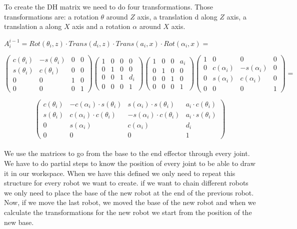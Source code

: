 \documentclass[12pt,a4paper,oneside,english]{book}
\begin{document}
To create the DH matrix we need to do four transformations. Those transformations are: a rotation $\theta$ around $Z$ axis, a translation d along $Z$ axis, a translation a along $X$ axis and a rotation $\alpha$ around $X$ axis.

$A_{i}^{i-1} = Rot(\theta_{i},z)\cdot Trans(d_{i},z)\cdot Trans(a_{i},x)\cdot Rot(\alpha_{i},x) =$

\[
\begin{pmatrix}
c(\theta_{i}) & -s(\theta_{i}) & 0 & 0\\
s(\theta_{i}) & c(\theta_{i}) & 0 & 0\\
0 & 0 & 1 & 0\\
0 & 0 & 0 & 1
\end{pmatrix}
\begin{pmatrix}
1 & 0 & 0 & 0\\
0 & 1 & 0 & 0\\
0 & 0 & 1 & d_{i}\\
0 & 0 & 0 & 1
\end{pmatrix}
\begin{pmatrix}
1 & 0 & 0 & a_{i}\\
0 & 1 & 0 & 0\\
0 & 0 & 1 & 0\\
0 & 0 & 0 & 1
\end{pmatrix}
\begin{pmatrix}
1 & 0 & 0 & 0\\
0 & c(\alpha_{i}) & -s(\alpha_{i}) & 0\\
0 & s(\alpha_{i}) & c(\alpha_{i}) & 0\\
0 & 0 & 0 & 1
\end{pmatrix}
=
\]

\[
\begin{pmatrix}
c(\theta_{i}) & -c(\alpha_{i})\cdot s(\theta_{i}) & s(\alpha_{i})\cdot s(\theta_{i}) & a_{i}\cdot c(\theta_{i})\\
s(\theta_{i}) & c(\alpha_{i})\cdot c(\theta_{i}) & -s(\alpha_{i})\cdot c(\theta_{i}) & a_{i}\cdot s(\theta_{i})\\
0 & s(\alpha_{i}) & c(\alpha_{i}) & d_{i}\\
0 & 0 & 0 & 1
\end{pmatrix}
\]
\\
We use the matrices to go from the base to the end effector through every joint. We have to do partial steps to know the position of every joint to be able to draw it in our workspace. When we have this defined we only need to repeat this structure for every robot we want to create. if we want to chain different robots we only need to place the base of the new robot at the end of the previous robot. Now, if we move the last robot, we moved the base of the new robot and when we calculate the transformations for the new robot we start from the position of the new base.
\end{document}

